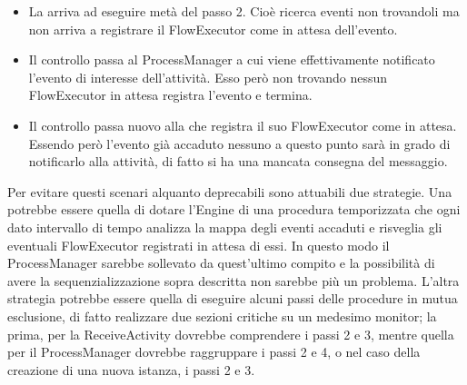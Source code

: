 \begin{itemize}
  \item La  arriva ad eseguire metà del passo 2. Cioè
  ricerca eventi non trovandoli ma non arriva a registrare il FlowExecutor come
  in attesa dell'evento.
  \item Il controllo passa al ProcessManager a cui viene effettivamente
  notificato l'evento di interesse dell'attività. Esso però non trovando
  nessun FlowExecutor in attesa registra l'evento e termina.
  \item Il controllo passa nuovo alla  che registra il
  suo FlowExecutor come in attesa. Essendo però l'evento già accaduto nessuno a
  questo punto sarà in grado di notificarlo alla attività, di fatto si ha una
  mancata consegna del messaggio.
\end{itemize}

Per evitare questi scenari alquanto deprecabili sono attuabili due strategie.
Una potrebbe essere quella di dotare l'Engine di una procedura temporizzata che
ogni dato intervallo di tempo analizza la mappa degli eventi accaduti e risveglia
gli eventuali FlowExecutor registrati in attesa di essi. In questo modo il
ProcessManager sarebbe sollevato da quest'ultimo compito e la possibilità di
avere la sequenzializzazione sopra descritta non sarebbe più un problema.
L'altra strategia potrebbe essere quella di eseguire alcuni passi delle
procedure in mutua esclusione, di fatto realizzare due sezioni critiche su un
medesimo monitor; la prima, per la ReceiveActivity dovrebbe comprendere i passi
2 e 3, mentre quella per il ProcessManager dovrebbe raggruppare i passi 2 e 4, o
nel caso della creazione di una nuova istanza, i passi 2 e 3.


